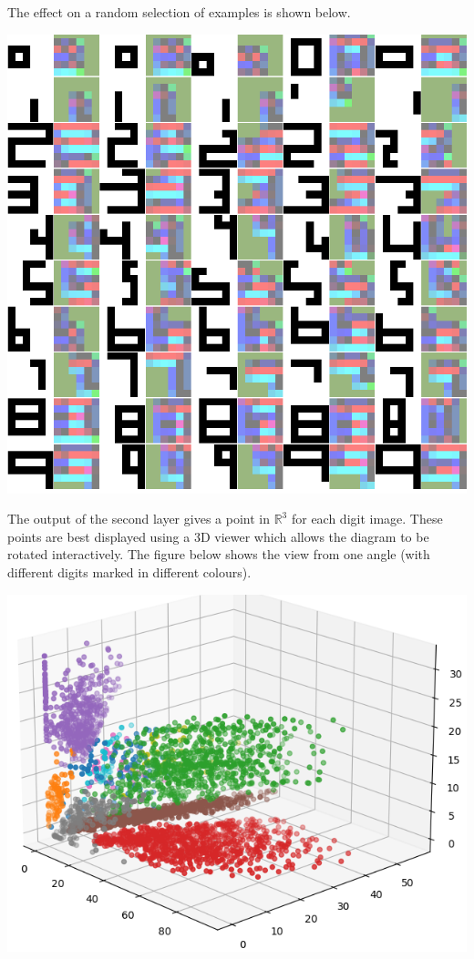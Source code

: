 \documentclass{amsart}
\newcommand{\R}         {{\mathbb{R}}}
\renewcommand{\:}{\colon}
\theoremstyle{definition}
\begin{document}
The effect on a random selection of examples is shown below.
\begin{center}
 \includegraphics[scale=0.5]{digit_features.png}
\end{center}

The output of the second layer gives a point in $\R^3$ for each digit
image.  These points are best displayed using a 3D viewer which allows
the diagram to be rotated interactively.  The figure below shows the
view from one angle (with different digits marked in different colours).
\begin{center}
 \includegraphics[scale=0.5]{digit_embedding.png}
\end{center}
\end{document}
